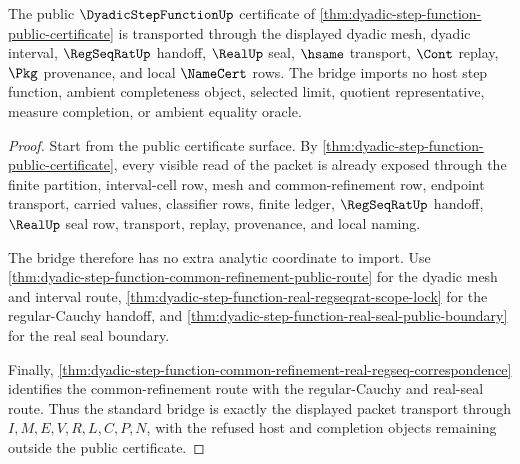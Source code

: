 \begin{theorem}
\label{thm:dyadic-step-function-standard-bridge}
The public $\DyadicStepFunctionUp$ certificate of \autoref{thm:dyadic-step-function-public-certificate} is transported through the displayed dyadic mesh, dyadic interval, $\RegSeqRatUp$ handoff, $\RealUp$ seal, $\hsame$ transport, $\Cont$ replay, $\Pkg$ provenance, and local $\NameCert$ rows. The bridge imports no host step function, ambient completeness object, selected limit, quotient representative, measure completion, or ambient equality oracle.
\end{theorem}
\begin{proof}
Start from the public certificate surface. By \autoref{thm:dyadic-step-function-public-certificate}, every visible read of the packet is already exposed through the finite partition, interval-cell row, mesh and common-refinement row, endpoint transport, carried values, classifier rows, finite ledger, $\RegSeqRatUp$ handoff, $\RealUp$ seal row, transport, replay, provenance, and local naming.

The bridge therefore has no extra analytic coordinate to import. Use \autoref{thm:dyadic-step-function-common-refinement-public-route} for the dyadic mesh and interval route, \autoref{thm:dyadic-step-function-real-regseqrat-scope-lock} for the regular-Cauchy handoff, and \autoref{thm:dyadic-step-function-real-seal-public-boundary} for the real seal boundary.

Finally, \autoref{thm:dyadic-step-function-common-refinement-real-regseq-correspondence} identifies the common-refinement route with the regular-Cauchy and real-seal route. Thus the standard bridge is exactly the displayed packet transport through $I,M,E,V,R,L,C,P,N$, with the refused host and completion objects remaining outside the public certificate.
\end{proof}


